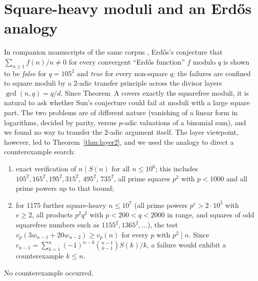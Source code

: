 \documentclass[11pt]{amsart}
\theoremstyle{definition}
\begin{document}
\section{Square-heavy moduli and an Erd\H{o}s analogy}\label{sec:erdos}

In companion manuscripts of the same corpus \cite{Keio1,Keio2,Keio3}, Erd\H{o}s's conjecture that
$\sum_{n\ge1}f(n)/n\ne0$ for every convergent ``Erd\H{o}s function'' $f$ modulo $q$ is shown to be
\emph{false} for $q=105^2$ and \emph{true} for every non-square $q$; the failures are confined to
square moduli by a $2$-adic transfer principle across the divisor layers $\gcd(n,q)=q/d$. Since
Theorem~A covers exactly the squarefree moduli, it is natural to ask whether Sun's conjecture
could fail at moduli with a large square part. The two problems are of different nature (vanishing of
a linear form in logarithms, decided by parity, versus $p$-adic valuations of a binomial sum), and
we found no way to transfer the $2$-adic argument itself. The layer viewpoint, however, led to
Theorem~\ref{thm:layer2}, and we used the analogy to direct a counterexample search:
\begin{enumerate}[label=(\alph*)]
\item exact verification of $n\mid S(n)$ for all $n\le 10^6$; this includes $105^2,165^2,195^2,315^2$,
$495^2$, $735^2$, all prime squares $p^2$ with $p<1000$ and all prime powers up to that bound;
\item for 1175 further square-heavy $n\le10^7$ (all prime powers $p^e>2\cdot10^5$ with $e\ge2$,
all products $p^2q^2$ with $p<200<q<2000$ in range, and squares of odd squarefree numbers such as
$1155^2,1365^2,\dots$), the test $v_p(3w_{n-1}+20w_{n-2})\ge v_p(n)$ for every $p$ with
$p^2\mid n$. Since $c_{n-1}=\sum_{k=1}^n(-1)^{n-k}\binom{n-1}{k-1}S(k)/k$, a failure would exhibit a
counterexample $k\le n$.
\end{enumerate}
No counterexample occurred.
\end{document}

